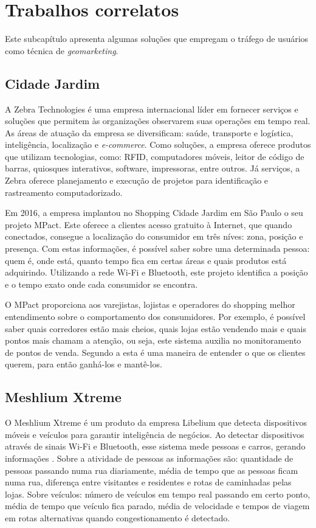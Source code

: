 \section{Trabalhos correlatos}
Este subcapítulo apresenta algumas soluções que empregam o tráfego de usuários como técnica de \emph{geomarketing}.

\subsection{Cidade Jardim}
A Zebra Technologies é uma empresa internacional líder em fornecer serviços e soluções que permitem às organizações observarem suas operações em
tempo real. As áreas de atuação da empresa se diversificam: saúde,
transporte e logística, inteligência, localização e \emph{e-commerce}. Como soluções, a empresa oferece produtos
que utilizam tecnologias, como: RFID, computadores móveis, leitor de código de barras,
quiosques interativos, software, impressoras, entre outros. Já serviços, a Zebra oferece planejamento e execução de projetos para identificação
e rastreamento computadorizado.

Em 2016, a empresa implantou no Shopping Cidade Jardim em São Paulo o seu projeto MPact. Este oferece a clientes acesso gratuito à Internet,
que quando conectados, consegue a localização do consumidor em três níves: zona, posição e presença. Com estas informações, é possível saber
sobre uma determinada pessoa: quem é, onde está, quanto tempo fica em certas áreas e quais produtos está adquirindo. Utilizando a rede Wi-Fi e
Bluetooth, este projeto identifica a posição e o tempo exato onde cada consumidor se encontra.

O MPact proporciona aos varejistas, lojistas e operadores do shopping melhor entendimento sobre o comportamento dos consumidores. Por exemplo, é
possível saber quais corredores estão mais cheios, quais lojas estão vendendo mais e quais pontos mais chamam a atenção, ou seja, este sistema
auxilia no monitoramento de pontos de venda. Segundo a  esta é uma maneira de entender o que os clientes querem,
para então ganhá-los e mantê-los.

\subsection{Meshlium Xtreme}
O Meshlium Xtreme é um produto da empresa Libelium que detecta dispositivos móveis e veículos para garantir inteligência de negócios. Ao detectar dispositivos
através de sinais Wi-Fi e Bluetooth, esse sistema mede pessoas e carros, gerando informações \cite{libelium}. Sobre a atividade de pessoas as informações
são: quantidade
de pessoas passando numa rua diariamente, média de tempo que as pessoas ficam numa rua, diferença entre visitantes e residentes e rotas
de caminhadas pelas lojas. Sobre veículos: número de veículos em tempo real passando em certo ponto, média de tempo que veículo fica parado,
média de velocidade e tempos de viagem em rotas alternativas quando congestionamento é detectado.

